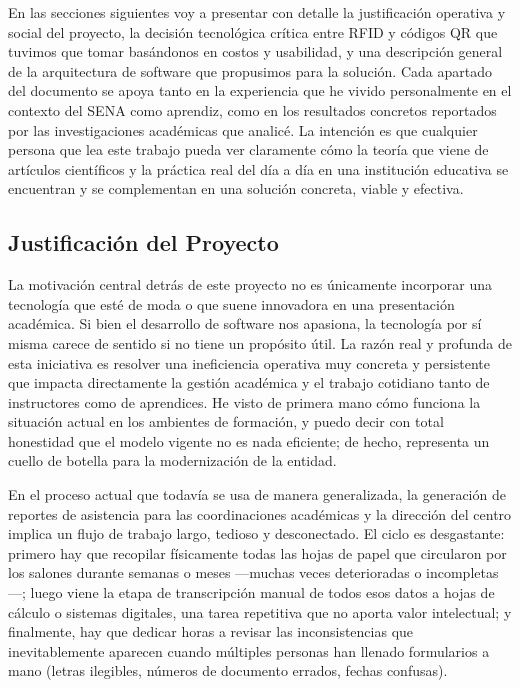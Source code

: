 En las secciones siguientes voy a presentar con detalle la justificación operativa y social del proyecto, la decisión tecnológica crítica entre RFID y códigos QR que tuvimos que tomar basándonos en costos y usabilidad, y una descripción general de la arquitectura de software que propusimos para la solución. Cada apartado del documento se apoya tanto en la experiencia que he vivido personalmente en el contexto del SENA como aprendiz, como en los resultados concretos reportados por las investigaciones académicas que analicé. La intención es que cualquier persona que lea este trabajo pueda ver claramente cómo la teoría que viene de artículos científicos y la práctica real del día a día en una institución educativa se encuentran y se complementan en una solución concreta, viable y efectiva.

\subsection{Justificación del Proyecto}
La motivación central detrás de este proyecto no es únicamente incorporar una tecnología que esté de moda o que suene innovadora en una presentación académica. Si bien el desarrollo de software nos apasiona, la tecnología por sí misma carece de sentido si no tiene un propósito útil. La razón real y profunda de esta iniciativa es resolver una ineficiencia operativa muy concreta y persistente que impacta directamente la gestión académica y el trabajo cotidiano tanto de instructores como de aprendices. He visto de primera mano cómo funciona la situación actual en los ambientes de formación, y puedo decir con total honestidad que el modelo vigente no es nada eficiente; de hecho, representa un cuello de botella para la modernización de la entidad.

En el proceso actual que todavía se usa de manera generalizada, la generación de reportes de asistencia para las coordinaciones académicas y la dirección del centro implica un flujo de trabajo largo, tedioso y desconectado. El ciclo es desgastante: primero hay que recopilar físicamente todas las hojas de papel que circularon por los salones durante semanas o meses —muchas veces deterioradas o incompletas—; luego viene la etapa de transcripción manual de todos esos datos a hojas de cálculo o sistemas digitales, una tarea repetitiva que no aporta valor intelectual; y finalmente, hay que dedicar horas a revisar las inconsistencias que inevitablemente aparecen cuando múltiples personas han llenado formularios a mano (letras ilegibles, números de documento errados, fechas confusas).


